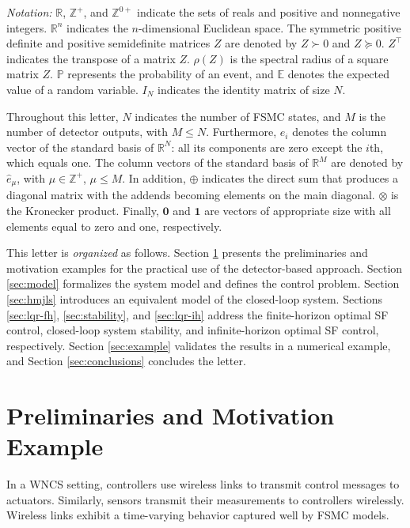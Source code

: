 \documentclass[journal,twoside,web]{ieeecolor}
\begin{document}
\textit{Notation:} $\mathbb{R}$, $\mathbb{Z}^{+}$, and $\mathbb{Z}^{0+}$ indicate the sets of reals and positive and nonnegative integers. $\mathbb{R}^{n}$ indicates the $n$-dimensional Euclidean space. The symmetric positive definite and positive semidefinite matrices $Z$ are denoted by $Z\succ 0$ and $Z\succeq 0$. $Z^{\top}$ indicates the transpose of a matrix $Z$. $\rho(Z)$ is the spectral radius of a square matrix $Z$. 
$\mathbb{P}$ represents the probability of an event, and $\mathbb{E}$ denotes the expected value of a random variable. $I_N$ indicates the identity matrix of size $N$. 

Throughout this letter, $N$ indicates the number of FSMC states, and $M$ is the number of detector outputs, with $M\leq N$.
Furthermore, $e_i$ denotes the column vector of the standard basis of $\mathbb{R}^{N}$: all its components are zero except the $i$th, which equals one. The column vectors of the standard basis of $\mathbb{R}^{M}$ are denoted by $\hat{e}_{\mu}$, with $\mu\in\mathbb{Z}^{+}$, $\mu\leq M$. In addition, $\oplus$ indicates the direct sum that produces a diagonal matrix with the addends becoming elements on the main diagonal. $\otimes$ is the Kronecker product. Finally, $\mathbf{0}$ and $\mathbf{1}$ are vectors of appropriate size with all elements equal to zero and one, respectively.

This letter is \emph{organized} as follows. 
Section \ref{sec:prelim} presents the preliminaries and motivation examples for the practical use of the detector-based approach.
Section \ref{sec:model} formalizes the system model and defines the control problem.
Section \ref{sec:hmjls} introduces an equivalent model of the closed-loop system.
Sections \ref{sec:lqr-fh}, \ref{sec:stability}, and \ref{sec:lqr-ih} address the finite-horizon optimal SF control, closed-loop system stability, and infinite-horizon optimal SF control, respectively.
Section \ref{sec:example} validates the results in a numerical example, and 
Section \ref{sec:conclusions} concludes the letter.

\section{Preliminaries and Motivation Example}\label{sec:prelim}
In a WNCS setting, controllers use wireless links to transmit control messages to actuators. 
Similarly, sensors transmit their measurements to controllers wirelessly. Wireless links exhibit a time-varying behavior captured well by FSMC models. 
\end{document}
